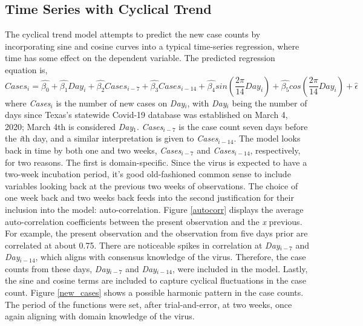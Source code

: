\documentclass{article}
\begin{document}
\subsection{Time Series with Cyclical Trend}
The cyclical trend model attempts to predict the new case counts by incorporating sine and cosine curves into a typical time-series regression, where time has some effect on the dependent variable. The predicted regression equation is,\begin{equation}
    Cases_i = \hat{\beta_0} + \hat{\beta_1}Day_i + \hat{\beta_2}Cases_{i-7} + \hat{\beta_3}Cases_{i-14} + \hat{\beta_4}sin(\frac{2\pi}{14}Day_i) + \hat{\beta_5}cos(\frac{2\pi}{14}Day_i) + \hat{\epsilon}
\end{equation}
where \textit{Cases$_i$} is the number of new cases on \textit{Day$_i$}, with \textit{Day$_i$} being the number of days since Texas's statewide Covid-19 database was established on March 4, 2020; March 4th is considered \textit{Day$_1$}. \textit{Cases$_{i-7}$} is the case count seven days before the \textit{i}th day, and a similar interpretation is given to \textit{Cases$_{i-14}$}. The model looks back in time by both one and two weeks, \textit{Cases$_{i-7}$} and \textit{Cases$_{i-14}$}, respectively, for two reasons. The first is domain-specific. Since the virus is expected to have a two-week incubation period, it's good old-fashioned common sense to include variables looking back at the previous two weeks of observations. The choice of one week back and two weeks back feeds into the second justification for their inclusion into the model: auto-correlation. Figure \ref{autocorr} displays the average auto-correlation coefficients between the present observation and the \textit{x} previous. For example, the present observation and the observation from five days prior are correlated at about 0.75. There are noticeable spikes in correlation at \textit{Day$_{i-7}$} and \textit{Day$_{i-14}$}, which aligns with consensus knowledge of the virus. Therefore, the case counts from these days, \textit{Day$_{i-7}$} and \textit{Day$_{i-14}$}, were included in the model. Lastly, the sine and cosine terms are included to capture cyclical fluctuations in the case count. Figure \ref{new_cases} shows a possible harmonic pattern in the case counts. The period of the functions were set, after trial-and-error, at two weeks, once again aligning with domain knowledge of the virus.\\\\
\end{document}
